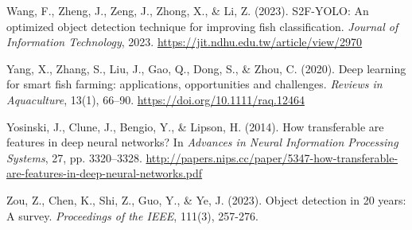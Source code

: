 \begin{bibliography}
 Wang, F., Zheng, J., Zeng, J., Zhong, X., \& Li, Z. (2023). S2F-YOLO: An optimized object detection technique for improving fish classification. \textit{Journal of Information Technology}, 2023. \url{https://jit.ndhu.edu.tw/article/view/2970}

 Yang, X., Zhang, S., Liu, J., Gao, Q., Dong, S., \& Zhou, C. (2020). Deep learning for smart fish farming: applications, opportunities and challenges. \textit{Reviews in Aquaculture}, 13(1), 66–90. \url{https://doi.org/10.1111/raq.12464}

 Yosinski, J., Clune, J., Bengio, Y., \& Lipson, H. (2014). How transferable are features in deep neural networks? In \textit{Advances in Neural Information Processing Systems}, 27, pp. 3320–3328. \url{http://papers.nips.cc/paper/5347-how-transferable-are-features-in-deep-neural-networks.pdf}

 Zou, Z., Chen, K., Shi, Z., Guo, Y., \& Ye, J. (2023). Object detection in 20 years: A survey. \textit{Proceedings of the IEEE}, 111(3), 257-276.

\end{bibliography}